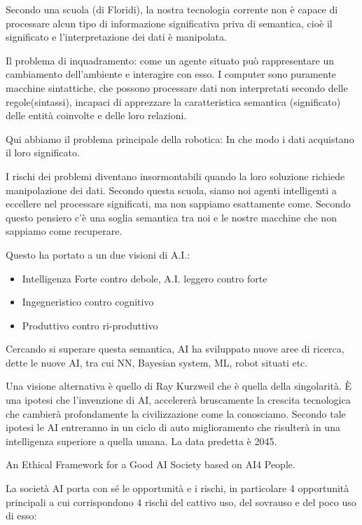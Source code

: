 \documentclass[a4page, 11pt]{article}
\begin{document}
Secondo una scuola (di Floridi), la nostra tecnologia corrente non è
capace di processare alcun tipo di informazione significativa priva di
semantica, cioè il significato e l'interpretazione dei dati è
manipolata.

Il problema di inquadramento: come un agente situato può rappresentare
un cambiamento dell'ambiente e interagire con esso. I computer sono
puramente macchine sintattiche, che possono processare dati non
interpretati secondo delle regole(sintassi), incapaci di apprezzare la
caratteristica semantica (significato) delle entità coinvolte e delle
loro relazioni.

Qui abbiamo il problema principale della robotica: In che modo i dati
acquistano il loro significato.

I rischi dei problemi diventano insormontabili quando la loro soluzione
richiede manipolazione dei dati. Secondo questa scuola, siamo noi agenti
intelligenti a eccellere nel processare significati, ma non sappiamo
esattamente come. Secondo questo pensiero c'è una soglia semantica tra
noi e le nostre macchine che non sappiamo come recuperare.

Questo ha portato a un due visioni di A.I.:

\begin{itemize}
	 
	\item
	Intelligenza Forte contro debole, A.I. leggero contro forte
	\item
	Ingegneristico contro cognitivo
	\item
	Produttivo contro ri-produttivo
\end{itemize}

Cercando si superare questa semantica, AI ha sviluppato nuove aree di
ricerca, dette le nuove AI, tra cui NN, Bayesian system, ML, robot
situati etc.

Una visione alternativa è quello di Ray Kurzweil che è quella della
singolarità. È una ipotesi che l'invenzione di AI, accelererà
bruscamente la crescita tecnologica che cambierà profondamente la
civilizzazione come la conosciamo. Secondo tale ipotesi le AI entreranno
in un ciclo di auto miglioramento che risulterà in una intelligenza
superiore a quella umana. La data predetta è 2045.

An Ethical Framework for a Good AI Society based on AI4 People.

La società AI porta con sé le opportunità e i rischi, in particolare 4
opportunità principali a cui corrispondono 4 rischi del cattivo uso, del
sovrauso e del poco uso di esso:
\end{document}
